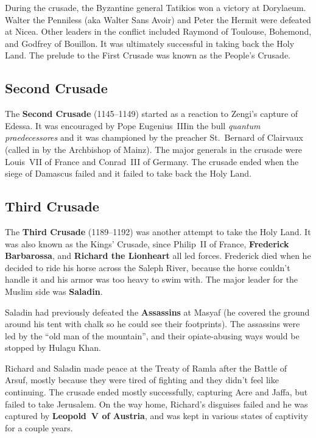During the crusade, the Byzantine general Tatikios won a victory at Dorylaeum.
Walter the Penniless (aka Walter Sans Avoir) and Peter the Hermit were defeated at Nicea.
Other leaders in the conflict included Raymond of Toulouse, Bohemond, and Godfrey of Bouillon.
It was ultimately successful in taking back the Holy Land.
The prelude to the First Crusade was known as the People's Crusade.

\subsection*{Second Crusade}

The \textbf{Second Crusade} (1145--1149) started as a reaction to Zengi's capture of Edessa.
It was encouraged by Pope Eugenius~III\@ in the bull \textit{quantum praedecessores}
and it was championed by the preacher St.\ Bernard of Clairvaux (called in by the Archbishop of Mainz).
The major generals in the crusade were Louis~VII of France and Conrad~III of Germany.
The crusade ended when the siege of Damascus failed and it failed to take back the Holy Land.

\subsection*{Third Crusade}

The \textbf{Third Crusade} (1189--1192) was another attempt to take the Holy Land.
It was also known as the Kings' Crusade,
since Philip~II of France, \textbf{Frederick Barbarossa}, and \textbf{Richard the Lionheart} all led forces.
Frederick died when he decided to ride his horse across the Saleph River,
because the horse couldn't handle it and his armor was too heavy to swim with.
The major leader for the Muslim side was \textbf{Saladin}.

Saladin had previously defeated the \textbf{Assassins} at Masyaf
(he covered the ground around his tent with chalk so he could see their footprints).
The assassins were led by the ``old man of the mountain'',
and their opiate-abusing ways would be stopped by Hulagu Khan.

Richard and Saladin made peace at the Treaty of Ramla after the Battle of Arsuf,
mostly because they were tired of fighting and they didn't feel like continuing.
The crusade ended mostly successfully, capturing Acre and Jaffa, but failed to take Jerusalem.
On the way home, Richard's disguises failed and he was captured by \textbf{Leopold~V of Austria},
and was kept in various states of captivity for a couple years.

